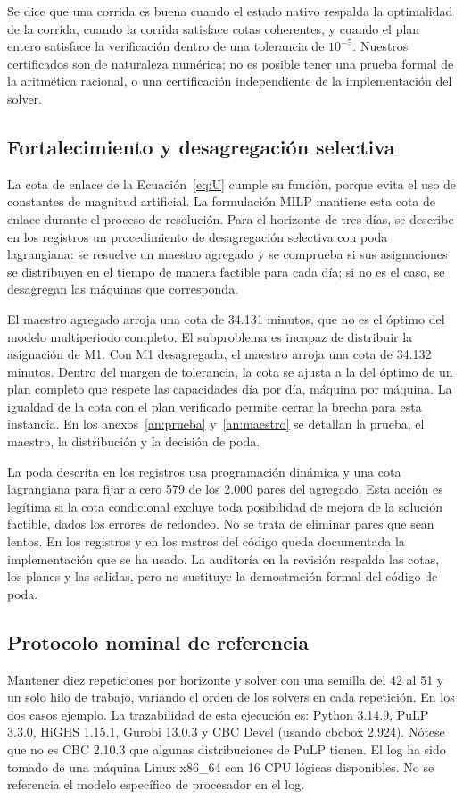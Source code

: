 \documentclass[12pt,a4paper,oneside]{article}
\begin{document}
Se dice que una corrida es buena cuando el estado nativo respalda la optimalidad de la corrida, cuando la corrida satisface cotas coherentes, y cuando el plan entero satisface la verificación dentro de una tolerancia de $10^{-5}$. Nuestros certificados son de naturaleza numérica; no es posible tener una prueba formal de la aritmética racional, o una certificación independiente de la implementación del solver.

\subsection{Fortalecimiento y desagregación selectiva}
La cota de enlace de la Ecuaci{\'o}n~\eqref{eq:U} cumple su funci{\'o}n, porque evita el uso de constantes de magnitud artificial. La formulación MILP mantiene esta cota de enlace durante el proceso de resolución. Para el horizonte de tres d{\'i}as, se describe en los registros un procedimiento de desagregaci{\'o}n selectiva con poda lagrangiana: se resuelve un maestro agregado y se comprueba si sus asignaciones se distribuyen en el tiempo de manera factible para cada d{\'i}a; si no es el caso, se desagregan las m{\'a}quinas que corresponda.

El maestro agregado arroja una cota de 34.131 minutos, que no es el {\'o}ptimo del modelo multiperiodo completo. El subproblema es incapaz de distribuir la asignaci{\'o}n de M1. Con M1 desagregada, el maestro arroja una cota de 34.132 minutos. Dentro del margen de tolerancia, la cota se ajusta a la del {\'o}ptimo de un plan completo que respete las capacidades d{\'i}a por d{\'i}a, m{\'a}quina por m{\'a}quina. La igualdad de la cota con el plan verificado permite cerrar la brecha para esta instancia. En los anexos~\ref{an:prueba} y~\ref{an:maestro} se detallan la prueba, el maestro, la distribuci{\'o}n y la decisi{\'o}n de poda.

La poda descrita en los registros usa programaci\'{o}n din\'{a}mica \cite{taha} y una cota lagrangiana para fijar a cero 579 de los 2.000 pares del agregado. Esta acci{\'o}n es leg{\'i}tima si la cota condicional excluye toda posibilidad de mejora de la soluci{\'o}n factible, dados los errores de redondeo. No se trata de eliminar pares que sean lentos. En los registros y en los rastros del c{\'o}digo queda documentada la implementaci{\'o}n que se ha usado. La auditor{\'i}a en la revisi{\'o}n respalda las cotas, los planes y las salidas, pero no sustituye la demostraci{\'o}n formal del c{\'o}digo de poda.

\subsection{Protocolo nominal de referencia}
Mantener diez repeticiones por horizonte y solver con una semilla del 42 al 51 y un solo hilo de trabajo, variando el orden de los solvers en cada repetición. En los dos casos ejemplo. La trazabilidad de esta ejecución es: Python 3.14.9, PuLP 3.3.0, HiGHS 1.15.1, Gurobi 13.0.3 y CBC Devel (usando cbcbox 2.924). Nótese que no es CBC 2.10.3 que algunas distribuciones de PuLP tienen. El log ha sido tomado de una máquina Linux x86\_64 con 16 CPU lógicas disponibles. No se referencia el modelo específico de procesador en el log.
\end{document}
